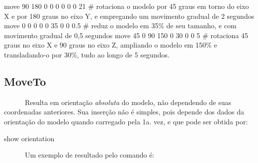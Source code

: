 \documentclass[
  letterpaper,
  DIV=11,
  numbers=noendperiod]{scrreprt}
\newenvironment{Shaded}{\begin{snugshade}}{\end{snugshade}}
\newcommand{\CommentTok}[1]{\textcolor[rgb]{0.37,0.37,0.37}{#1}}
\newcommand{\DecValTok}[1]{\textcolor[rgb]{0.68,0.00,0.00}{#1}}
\newcommand{\FloatTok}[1]{\textcolor[rgb]{0.68,0.00,0.00}{#1}}
\newcommand{\NormalTok}[1]{\textcolor[rgb]{0.00,0.23,0.31}{#1}}
\begin{document}
\begin{Shaded}
\begin{Highlighting}[]
\NormalTok{move }\DecValTok{90} \DecValTok{180} \DecValTok{0} \DecValTok{0} \DecValTok{0} \DecValTok{0} \DecValTok{0} \DecValTok{0} \DecValTok{21} \CommentTok{\# rotaciona o modelo por 45 graus em torno do eixo X e por 180 graus no eixo Y, e empregando um movimento gradual de 2 segundos}
\NormalTok{move }\DecValTok{0} \DecValTok{0} \DecValTok{0} \DecValTok{0} \DecValTok{0} \DecValTok{35} \DecValTok{0} \DecValTok{0} \FloatTok{0.5} \CommentTok{\# reduz o modelo em 35\% de seu tamanho, e com movimento gradual de 0,5 segundos}
\NormalTok{move }\DecValTok{45} \DecValTok{0} \DecValTok{90} \DecValTok{150} \DecValTok{0} \DecValTok{30} \DecValTok{0} \DecValTok{0} \DecValTok{5} \CommentTok{\# rotaciona 45 graus no eixo X e 90 graus no eixo Z, ampliando o modelo em 150\% e transladando{-}o por 30\%, tudo ao longo de 5 segundos.}
\end{Highlighting}
\end{Shaded}

\subsection{MoveTo}\label{moveto}

~~~~~~Resulta em orientação \emph{absoluta} do modelo, não dependendo de
suas coordenadas anteriores. Sua inserção não é simples, pois depende
dos dados da orientação do modelo quando carregado pela 1a. vez, e que
pode ser obtida por:

\begin{Shaded}
\begin{Highlighting}[]
\NormalTok{show orientation}
\end{Highlighting}
\end{Shaded}

~~~~~~Um exemplo de resultado pelo comando é:
\end{document}
